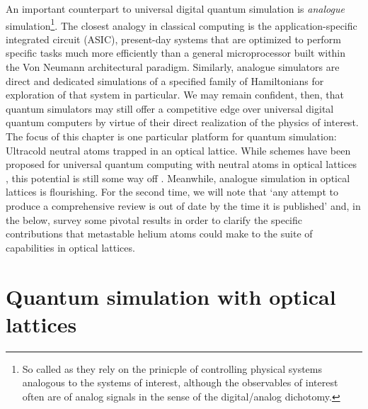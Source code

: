 	An important counterpart to universal digital quantum simulation is \emph{analogue} simulation\footnote{So called as they rely on the prinicple of controlling physical systems analogous to the systems of interest, although the observables of interest often are of analog signals in the sense of the digital/analog dichotomy.}.
	The closest analogy in classical computing is the application-specific integrated circuit (ASIC), present-day systems that are optimized to perform specific tasks much more efficiently than a general microprocessor built within the Von Neumann architectural paradigm.
	Similarly, analogue simulators are direct and dedicated simulations of a specified family of Hamiltonians for exploration of that system in particular.
	We may remain confident, then, that quantum simulators may still offer a competitive edge over universal digital quantum computers by virtue of their direct realization of the physics of interest.
	The focus of this chapter is one particular platform for quantum simulation: Ultracold neutral atoms trapped in an optical lattice. 
	While schemes have been proposed for universal quantum computing with neutral atoms in optical lattices \cite{Brennen99,Henriet20}, this potential is still some way off \cite{Markov00}.
	Meanwhile, analogue simulation in optical lattices is flourishing.
	For the second time, we will note that `any attempt to produce a comprehensive review is out of date by the time it is published' and, in the below, survey some pivotal results in order to clarify the specific contributions that metastable helium atoms could make to the suite of capabilities in optical lattices.
	



\section{Quantum simulation with optical lattices}

